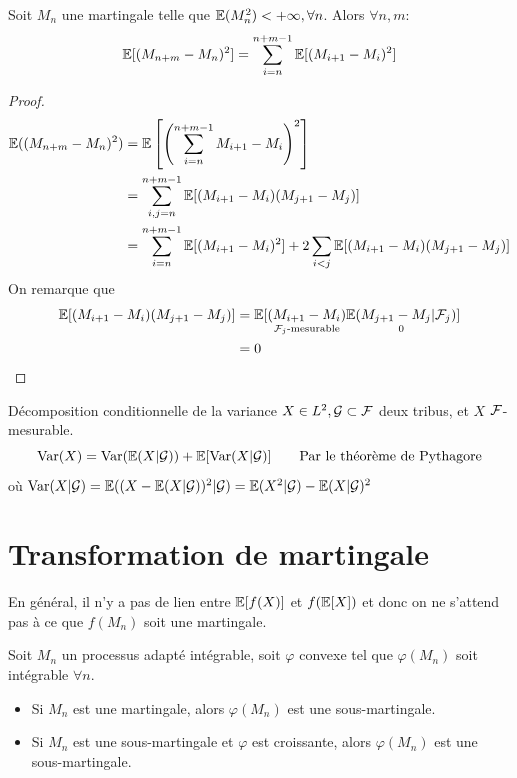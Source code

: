 \documentclass[]{report}
\begin{document}
    \begin{prop}{}{}
        Soit $M_n$ une martingale telle que $\mathbb{E}(M_n^2)<+\infty,\forall n$. Alors $\forall n,m$:
        \[\mathbb{E}[(M_{n+m}-M_n)^2]=\sum_{i=n}^{n+m-1}\mathbb{E}[(M_{i+1}-M_i)^2]\]
    \end{prop}

    \begin{proof}
        \begin{align*}
            \mathbb{E}((M_{n+m}-M_n)^2)&=\mathbb{E}\left[\left(\sum_{i=n}^{n+m-1}M_{i+1}-M_i\right)^2\right]\\
            &=\sum_{i,j=n}^{n+m-1}\mathbb{E}[(M_{i+1}-M_i)(M_{j+1}-M_j)]\\
            &=\sum_{i=n}^{n+m-1}\mathbb{E}[(M_{i+1}-M_i)^2]+2\sum_{i<j}\mathbb{E}[(M_{i+1}-M_i)(M_{j+1}-M_j)]
        \end{align*}
        On remarque que
        \begin{align*}
            \mathbb{E}[(M_{i+1}-M_i)(M_{j+1}-M_j)]&=\mathbb{E}[\underset{\mathcal{F}_j\text{-mesurable}}{(M_{i+1}-M_i)}\underset{0}{\mathbb{E}(M_{j+1}-M_j|\mathcal{F}_j)}]\\
            &=0
        \end{align*}
    \end{proof}

    \begin{re}{Décomposition conditionnelle de la variance}{}
        $X\in L^2,\mathcal{G}\subset \mathcal{F}$ deux tribus, et $X$ $\mathcal{F}$-mesurable.
        \[\text{Var}(X)=\text{Var}(\mathbb{E}(X|\mathcal{G}))+\mathbb{E}[\text{Var}(X|\mathcal{G})]\qquad \text{Par le théorème de Pythagore}\]
        où $\text{Var}(X|\mathcal{G})=\mathbb{E}((X-\mathbb{E}(X|\mathcal{G}))^2|\mathcal{G})=\mathbb{E}(X^2|\mathcal{G})-\mathbb{E}(X|\mathcal{G})^2$
    \end{re}

    \section{Transformation de martingale}

    En général, il n'y a pas de lien entre $\mathbb{E}[f(X)]$ et $f(\mathbb{E}[X])$ et donc on ne s'attend pas à ce que $f(M_n)$ soit une martingale.

    \begin{prop}{}{}
        Soit $M_n$ un processus adapté intégrable, soit $\varphi$ convexe tel que $\varphi(M_n)$ soit intégrable $\forall n$.
        \begin{itemize}
            \item Si $M_n$ est une martingale, alors $\varphi(M_n)$ est une sous-martingale.
            \item Si $M_n$ est une sous-martingale et $\varphi$ est croissante, alors $\varphi(M_n)$ est une sous-martingale.
        \end{itemize}
    \end{prop}
\end{document}
